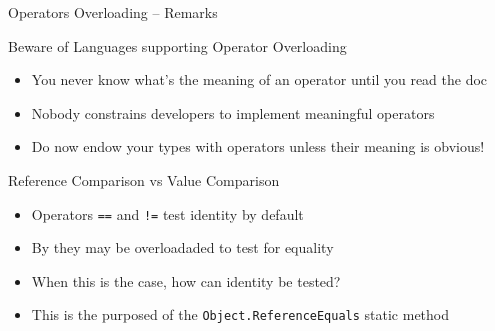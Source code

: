 \documentclass[presentation]{beamer}
\begin{document}
\begin{frame}{Operators Overloading -- Remarks}
  \begin{alertblock}{Beware of Languages supporting Operator Overloading}
    \begin{itemize}
      \item You never know what's the meaning of an operator until you \alert{read the doc}
      \item Nobody constrains developers to implement \alert{meaningful} operators
      \item Do now endow your types with operators unless their meaning is \alert{obvious}!
    \end{itemize}
  \end{alertblock}

  \begin{exampleblock}{Reference Comparison vs Value Comparison}
    \begin{itemize}
      \item Operators \texttt{==} and \texttt{!=} test identity by default
      \item By they may be overloadaded to test for equality
      \item When this is the case, how can identity be tested?
      \item This is the purposed of the \texttt{Object.ReferenceEquals} static method
    \end{itemize}
  \end{exampleblock}
\end{frame}
\end{document}
